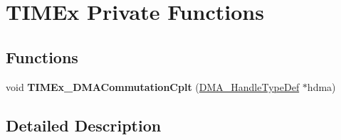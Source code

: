 \hypertarget{group___t_i_m_ex___private___functions}{}\section{T\+I\+M\+Ex Private Functions}
\label{group___t_i_m_ex___private___functions}
\subsection*{Functions}
\begin{DoxyCompactItemize}
\item 
\mbox{\label{group___t_i_m_ex___private___functions_gaf473fa38254d62a74a006a781fe0aeb8}} 
void {\bfseries T\+I\+M\+Ex\+\_\+\+D\+M\+A\+Commutation\+Cplt} (\hyperlink{group___d_m_a___exported___types_ga92b907d56a9c29b93d46782a7a04f91e}{D\+M\+A\+\_\+\+Handle\+Type\+Def} $\ast$hdma)
\end{DoxyCompactItemize}


\subsection{Detailed Description}

